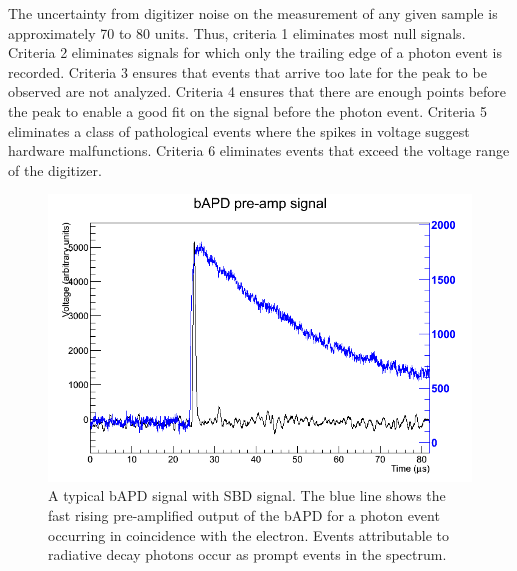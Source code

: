 \documentclass[oneside,12pt]{memoir}
\begin{document}
The uncertainty from digitizer noise on the measurement of any given sample is approximately 70 to 80 units. Thus, criteria 1 eliminates most null signals. Criteria 2 eliminates signals for which only the trailing edge of a photon event is recorded. Criteria 3 ensures that events that arrive too late for the peak to be observed are not analyzed. Criteria 4 ensures that there are enough points before the peak to enable a good fit on the signal before the photon event. Criteria 5 eliminates a class of pathological events where the spikes in voltage suggest hardware malfunctions. Criteria 6 eliminates events that exceed the voltage range of the digitizer.\par
\begin{figure}[t]
	\includegraphics[width=\textwidth]{bAPD_waveform.png}
	\caption[A typical bAPD signal with SBD signal.]{A typical bAPD signal with SBD signal. The blue line shows the fast rising pre-amplified output of the bAPD for a photon event occurring in coincidence with the electron. Events attributable to radiative decay photons occur as prompt events in the spectrum.}
	\label{fig:bapd_signal_ch4}
\end{figure}
\end{document}
